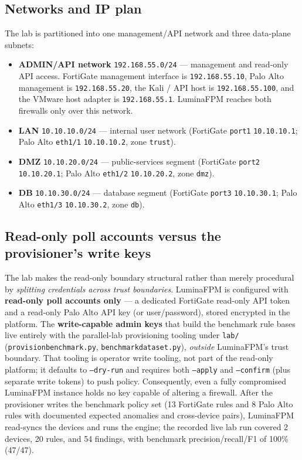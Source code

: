 \documentclass[12pt,a4paper]{report}
\renewcommand{\_}{\textunderscore\allowbreak}
\begin{document}
\subsection*{Networks and IP plan}
The lab is partitioned into one management/API network and three data-plane subnets:

\begin{itemize}[leftmargin=1.6em]
  \item \textbf{ADMIN/API network} \texttt{192.168.55.0/24} — management and read-only API access. FortiGate management interface is \texttt{192.168.55.10}, Palo Alto management is \texttt{192.168.55.20}, the Kali / API host is \texttt{192.168.55.100}, and the VMware host adapter is \texttt{192.168.55.1}. LuminaFPM reaches both firewalls only over this network.
  \item \textbf{LAN} \texttt{10.10.10.0/24} — internal user network (FortiGate \texttt{port1} \texttt{10.10.10.1}; Palo Alto \texttt{eth1/1} \texttt{10.10.10.2}, zone \texttt{trust}).
  \item \textbf{DMZ} \texttt{10.10.20.0/24} — public-services segment (FortiGate \texttt{port2} \texttt{10.10.20.1}; Palo Alto \texttt{eth1/2} \texttt{10.10.20.2}, zone \texttt{dmz}).
  \item \textbf{DB} \texttt{10.10.30.0/24} — database segment (FortiGate \texttt{port3} \texttt{10.10.30.1}; Palo Alto \texttt{eth1/3} \texttt{10.10.30.2}, zone \texttt{db}).
\end{itemize}

\subsection*{Read-only poll accounts versus the provisioner's write keys}
The lab makes the read-only boundary structural rather than merely procedural by \emph{splitting credentials across trust boundaries}. LuminaFPM is configured with \textbf{read-only poll accounts only} — a dedicated FortiGate read-only API token and a read-only Palo Alto API key (or user/password), stored encrypted in the platform. The \textbf{write-capable admin keys} that build the benchmark rule bases live entirely with the parallel-lab provisioning tooling under \texttt{lab/} (\texttt{provision\_benchmark.py}, \texttt{benchmark\_dataset.py}), \emph{outside} LuminaFPM's trust boundary. That tooling is operator write tooling, not part of the read-only platform; it defaults to \texttt{--dry-run} and requires both \texttt{--apply} and \texttt{--confirm} (plus separate write tokens) to push policy. Consequently, even a fully compromised LuminaFPM instance holds no key capable of altering a firewall. After the provisioner writes the benchmark policy set (13 FortiGate rules and 8 Palo Alto rules with documented expected anomalies and cross-device pairs), LuminaFPM read-syncs the devices and runs the engine; the recorded live lab run covered 2 devices, 20 rules, and 54 findings, with benchmark precision/recall/F1 of 100\% (47/47).
\end{document}
